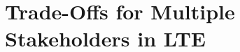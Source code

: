 \section{Trade-Offs for Multiple Stakeholders in LTE}\label{sec:application:lte_video}
\cite{Schwartz2013b}



 